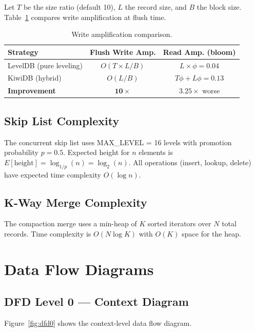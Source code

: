 \documentclass[oneside,a4paper,12pt]{book}
\begin{document}
Let $T$ be the size ratio (default 10), $L$ the record size, and $B$ the block size. Table~\ref{tab:write-amp} compares write amplification at flush time.

\begin{table}[!htbp]
\centering
\label{tab:write-amp}
\renewcommand{\arraystretch}{1.3}
\begin{tabular}{|l|c|c|}
\hline
\textbf{Strategy} & \textbf{Flush Write Amp.} & \textbf{Read Amp. (bloom)} \\
\hline
LevelDB (pure leveling) & $O(T \times L/B)$ & $L \times \phi = 0.04$ \\
\hline
KiwiDB (hybrid) & $O(L/B)$ & $T\phi + L\phi = 0.13$ \\
\hline
\textbf{Improvement} & $\mathbf{10\times}$ & $3.25\times$ worse \\
\hline
\end{tabular}
\caption{Write amplification comparison.}
\end{table}

\subsection{Skip List Complexity}

The concurrent skip list uses MAX\_LEVEL = 16 levels with promotion probability $p = 0.5$. Expected height for $n$ elements is $E[\text{height}] = \log_{1/p}(n) = \log_2(n)$. All operations (insert, lookup, delete) have expected time complexity $O(\log n)$.

\subsection{K-Way Merge Complexity}

The compaction merge uses a min-heap of $K$ sorted iterators over $N$ total records. Time complexity is $O(N \log K)$ with $O(K)$ space for the heap.

\section{Data Flow Diagrams}

\subsection{DFD Level 0 --- Context Diagram}

Figure~\ref{fig:dfd0} shows the context-level data flow diagram.
\end{document}
